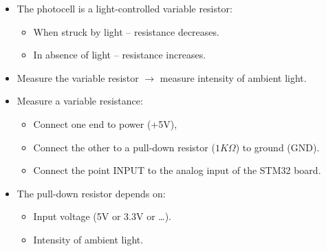 \documentclass[aspectratio=169]{beamer}
\begin{document}
\begin{frame}{}
\begin{columns}

\begin{itemize}

\item The photocell is a light-controlled variable resistor:

\begin{itemize}

\item \alert{When struck by light} -- resistance decreases.

\item \alert{In absence of light} -- resistance increases.

\end{itemize}

\item Measure the variable resistor $\rightarrow$ measure intensity of ambient light.

\item Measure a variable resistance:

\begin{itemize}

\item Connect one end to power (+5V),

\item Connect the other to a pull-down resistor ($1K\Omega$) to ground (GND).

\item Connect the point INPUT to the analog input of the STM32 board.

\end{itemize}

\item The pull-down resistor depends on:

\begin{itemize}

\item Input voltage (5V or 3.3V or \ldots).

\item Intensity of ambient light.

\end{itemize}



\end{itemize}

\begin{block}{}
\end{block}
\vspace{1cm}


\end{columns}
\end{frame}
\end{document}
